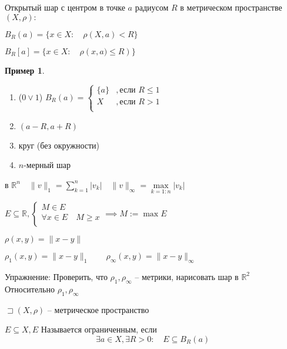 \documentclass{book}
\newcommand\R{\ensuremath{\mathbb{R}}}
\theoremstyle{definition}
\newtheorem*{example}{Пример}
\begin{document}
    \begin{definition}
        Открытый шар с центром в точке $a$ радиусом $R$ в метрическом пространстве $\left( X,\rho \right) :$

        $B_R(a) = \{x\in X:\quad\rho(X,a)<R\}$

        $B_R[a] = \{x\in X:\quad \rho\left(x, a)\leqslant R  \right) \}$
    \end{definition}
    \begin{example}
        \begin{enumerate}
            \item ($0 \vee 1$) $B_R(a) = \begin{cases}
                    \{a\} &, \text{если } R\leqslant 1\\
                    X&, \text{если } R>1\\
            \end{cases}$
        \item $(a-R,a+R)$
        \item круг (без окружности)
        \item $n$-мерный шар
        \end{enumerate}

        в $\R^n\quad \|v\|_1 = \sum_{k=1}^{n} |v_k|\quad \|v\|_{\infty } = \max\limits_{k=1:n} |v_k|$
    \end{example}
    \begin{definition}
        $E\subseteq \R, \begin{cases}
            M\in E\\
            \forall x\in E\quad 
            M\geqslant x\\
        \end{cases} \implies M:= \max E $
    \end{definition}

    $\rho(x,y) = \|x-y\|$

    $\rho_1(x,y) = \|x-y\|_1\qquad \rho_{\infty }(x,y) = \|x-y\|_{\infty }$

    Упражнение: Проверить, что $\rho_1, \rho_{\infty }$ -- метрики, нарисовать шар в $\R^2$ Относительно $\rho_1, \rho_{\infty }$

    \begin{definition}
        $\sqsupset (X, \rho)$ -- метрическое пространство

        $E \subseteq X, E $ Называется ограниченным, если  $$\exists a\in X, \exists R>0:\quad E\subseteq B_R(a) $$
    \end{definition}
\end{document}
